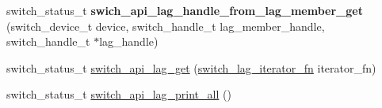 \begin{DoxyCompactItemize}
\item 
\hypertarget{group__LAG_gad6ed0ec34f6e6ad0201602e0912ed59f}{switch\+\_\+status\+\_\+t {\bfseries swich\+\_\+api\+\_\+lag\+\_\+handle\+\_\+from\+\_\+lag\+\_\+member\+\_\+get} (switch\+\_\+device\+\_\+t device, switch\+\_\+handle\+\_\+t lag\+\_\+member\+\_\+handle, switch\+\_\+handle\+\_\+t $\ast$lag\+\_\+handle)}\label{group__LAG_gad6ed0ec34f6e6ad0201602e0912ed59f}

\item 
switch\+\_\+status\+\_\+t \hyperlink{group__LAG_gaea133475de16760ba13de131e188555e}{switch\+\_\+api\+\_\+lag\+\_\+get} (\hyperlink{group__LAG_ga9ed343b0cd5c8838c1143ac2a41f1751}{switch\+\_\+lag\+\_\+iterator\+\_\+fn} iterator\+\_\+fn)
\item 
switch\+\_\+status\+\_\+t \hyperlink{group__LAG_ga853a95867809681efa613b81a04c0684}{switch\+\_\+api\+\_\+lag\+\_\+print\+\_\+all} ()
\end{DoxyCompactItemize}


